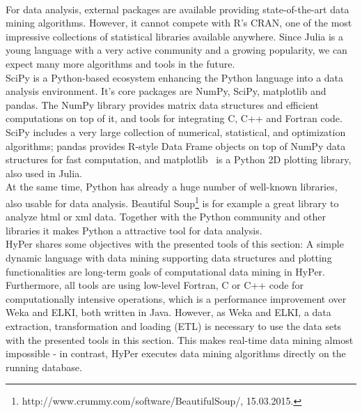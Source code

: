 \\
For data analysis, external packages are available providing state-of-the-art data mining algorithms. However, it cannot compete with R's CRAN, one of the most impressive collections of statistical libraries available anywhere. Since Julia is a young language with a very active community and a growing popularity, we can expect many more algorithms and tools in the future.
\\
SciPy is a Python-based ecosystem enhancing the Python language into a data analysis environment. It's core packages are NumPy, SciPy, matplotlib and pandas. The NumPy library provides matrix data structures and efficient computations on top of it, and tools for integrating C, C++ and Fortran code.
SciPy includes a very large collection of numerical, statistical, and optimization algorithms; pandas provides R-style Data Frame objects on top of NumPy data structures for fast computation, and matplotlib~\parencite{Hunter:2007} is a Python 2D plotting library, also used in Julia. 
\\
At the same time, Python has already a huge number of well-known libraries, also usable for data analysis. Beautiful Soup\footnote{http://www.crummy.com/software/BeautifulSoup/, 15.03.2015.} is for example a great library to analyze html or xml data. Together with the Python community and other libraries it makes Python a attractive tool for data analysis.
\\
HyPer shares some objectives with the presented tools of this section: A simple dynamic language with data mining supporting data structures and plotting functionalities are long-term goals of computational data mining in HyPer. Furthermore, all tools are using low-level Fortran, C or C++ code for computationally intensive operations, which is a performance improvement over Weka and ELKI, both written in Java. However, as Weka and ELKI, a data extraction, transformation and loading (ETL) is necessary to use the data sets with the presented tools in this section. This makes real-time data mining almost impossible - in contrast, HyPer executes data mining algorithms directly on the running database.


